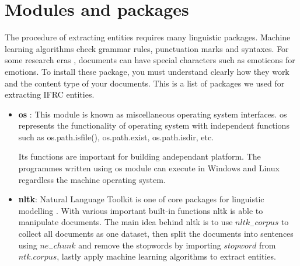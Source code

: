 \section{Modules and packages}
The procedure of extracting entities requires many linguistic packages. Machine learning algorithms check grammar rules, punctuation marks and syntaxes. For some    research eras ,  documents can have special characters such as emoticons for emotions. To install these package, you must understand clearly how they work and the content type of your documents. This is a list of packages we used for extracting IFRC entities.
\begin{itemize}
\item \textbf{os} : This module is  known as miscellaneous operating system interfaces. os represents the functionality of operating system with independent functions such as os.path.isfile(), os.path.exist, os.path.isdir, etc.  

Its functions are important for building andependant platform. The programmes written  using os module  can execute in Windows and Linux regardless the machine operating system. 

\item \textbf{nltk}: Natural Language Toolkit is one of core packages for linguistic modelling . With various important  built-in functions nltk is able to manipulate documents.  The main idea behind nltk is to use $nltk_{-}corpus$ to collect all documents as one dataset, then split the documents into sentences using $ne_{-}chunk$ and  remove the stopwords by  importing $stopword$ from $ntk.corpus$, lastly apply machine learning algorithms to extract entities.


\end{itemize}
